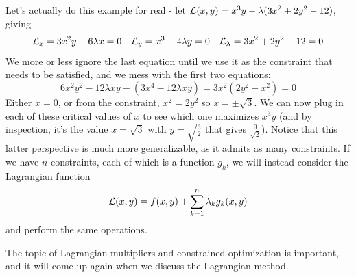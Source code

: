 Let's actually do this example for real - let $\mathcal{L}(x, y) = x^3y - \lambda(3x^2 + 2y^2 -12)$, giving 
\[
	\mathcal{L}_x = 3x^2 y - 6 \lambda x = 0 \quad \mathcal{L}_y = x^3 - 4 \lambda y = 0 \quad \mathcal{L}_\lambda = 3x^2 + 2y^2 - 12 = 0 
\]
We more or less ignore the last equation until we use it as the constraint that needs to be satisfied, and we mess with the first two equations: 
\[
	6x^2 y^2 - 12\lambda x y - (3x^4 - 12 \lambda x y) = 3x^2(2y^2 - x^2) = 0
\]
Either $x = 0$, or from the constraint, $x^2 = 2y^2$ so $x = \pm \sqrt{3}$. We can now plug in each of these critical values of $x$ to see which one maximizes $x^3y$ (and by inspection, it's the value $x = \sqrt{3}$ with $y = \sqrt{\frac{3}{2}}$ that gives $\frac{9}{\sqrt{2}}$).
Notice that this latter perspective is much more generalizable, as it admits as many constraints. If we have $n$ constraints, each of which is a function $g_k$, we will instead consider the Lagrangian function 
\[
	\mathcal{L}(x, y) = f(x,y) + \sum_{k=1}^n \lambda_k g_k(x, y)
\]
and perform the same operations. 

The topic of Lagrangian multipliers and constrained optimization is important, and it will come up again when we discuss the Lagrangian method. 
